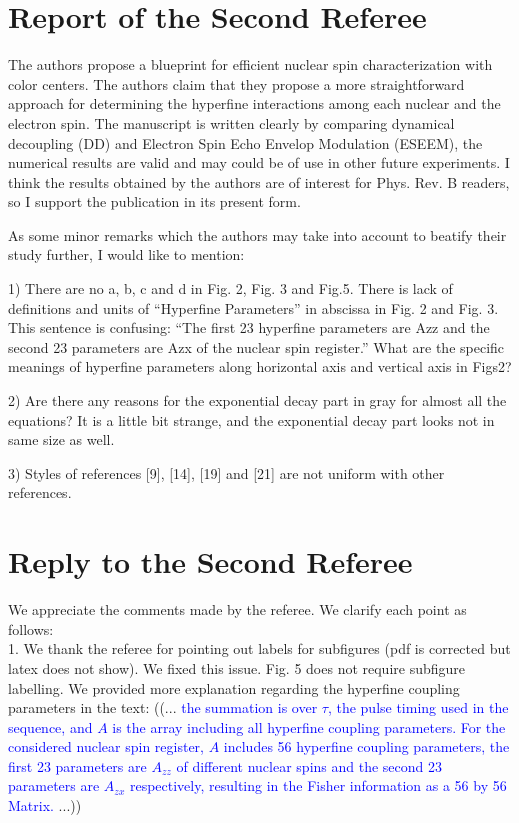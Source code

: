 \documentclass[12pt]{amsart}
\begin{document}
	\color{red} \section{Report of the Second Referee}
	The authors propose a blueprint for efficient nuclear spin
	characterization with color centers. The authors claim that they
	propose a more straightforward approach for determining the hyperfine
	interactions among each nuclear and the electron spin. The manuscript
	is written clearly by comparing dynamical decoupling (DD) and Electron
	Spin Echo Envelop Modulation (ESEEM), the numerical results are valid
	and may could be of use in other future experiments. I think the
	results obtained by the authors are of interest for Phys. Rev. B
	readers, so I support the publication in its present form.
	
	As some minor remarks which the authors may take into account to
	beatify their study further, I would like to mention:
	
	1) There are no a, b, c and d in Fig. 2, Fig. 3 and Fig.5. There is
	lack of definitions and units of “Hyperfine Parameters” in abscissa in
	Fig. 2 and Fig. 3. This sentence is confusing: “The first 23 hyperfine
	parameters are Azz and the second 23 parameters are Azx of the nuclear
	spin register.” What are the specific meanings of hyperfine parameters
	along horizontal axis and vertical axis in Figs2?
	
	2) Are there any reasons for the exponential decay part in gray for
	almost all the equations? It is a little bit strange, and the
	exponential decay part looks not in same size as well.
	
	3) Styles of references [9], [14], [19] and [21] are not uniform with
	other references.
	
	\color{black} \section*{Reply to the Second Referee}
	We appreciate the comments made by the referee. We clarify each point as follows:\\
	1. We thank the referee for pointing out labels for subfigures (pdf is corrected but latex does not show). We fixed this issue. Fig. 5 does not require subfigure labelling. We provided more explanation regarding the hyperfine coupling parameters in the text:
	((... \textcolor{blue}{the summation is over $\tau$, the pulse timing used in the sequence, and $A$ is the array including all hyperfine coupling parameters. For the considered nuclear spin register, $A$ includes 56 hyperfine coupling parameters, the first 23 parameters are $A_{zz}$ of different nuclear spins and the second 23 parameters are $A_{zx}$ respectively, resulting in the Fisher information as a 56 by 56 Matrix.} ...)) \\   
	
\end{document}

